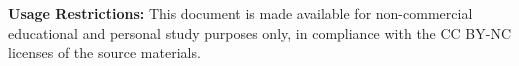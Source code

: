 \documentclass[a4paper,11pt]{article}
\theoremstyle{spaced}
\begin{document}
\vspace{0.5cm}
\noindent
\textbf{Usage Restrictions:} This document is made available for non-commercial educational and personal study purposes only, in compliance with the CC BY-NC licenses of the source materials.

\clearpage

\tableofcontents

\newpage
















\end{document}
